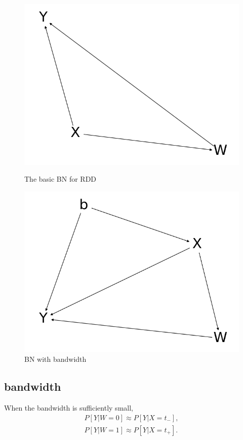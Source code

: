 \documentclass[a4 paper,12pt]{article}
\begin{document}
\begin{figure}[h]
	\centering
   \includegraphics[scale=0.5]{Figure_1.png}
   \caption{The basic BN for RDD}
   \label{fig:basic_rd_bns}
   \includegraphics[scale=0.5]{Figure_2.png}
   \caption{BN with bandwidth}
   \label{fig:bn_with_bdw}
\end{figure}

\subsection*{bandwidth}
When the bandwidth is sufficiently small,
\begin{align}
   P[Y|W=0]\approx P[Y|X=t_-],\\
   P[Y|W=1]\approx P[Y|X=t_+].
\end{align}
\end{document}
